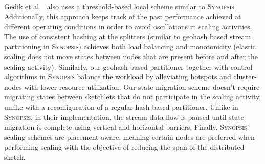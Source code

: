 Gedik et al.~\cite{schneider2009elastic} also uses a threshold-based local scheme similar to \textsc{Synopsis}. Additionally, this approach keeps track of the past performance achieved at different operating conditions in order to avoid oscillations in scaling activities.
The use of consistent hashing at the splitters (similar to geohash based stream partitioning in \textsc{Synopsis}) achieves both load balancing and monotonicity (elastic scaling does not move states between nodes that are present before and after the scaling activity).
Similarly, our geohash-based partitioner together with control algorithms in \textsc{Synopsis} balance the workload by alleviating hotspots and cluster-nodes with lower resource utilization.
Our state migration scheme doesn't require migrating states between sketchlets that do not participate in the scaling activity, unlike with a reconfiguration of a regular hash-based partitioner.
Unlike in \textsc{Synopsis}, in their implementation, the stream data flow is paused until state migration is complete using vertical and horizontal barriers.
Finally, \textsc{Synopsis}' scaling schemes are placement-aware, meaning certain nodes are preferred when performing scaling with the objective of reducing the span of the distributed sketch.


